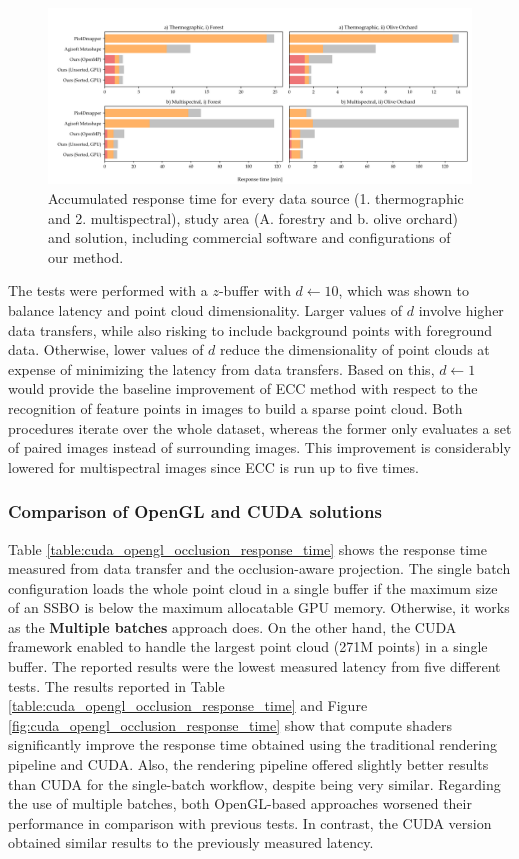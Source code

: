 \begin{figure}[ht]
    \centering
    \includegraphics[width=\linewidth]{figs/multi_thermal_projection/results/stacked_global_time.png}
    \caption{Accumulated response time for every data source (1. thermographic and 2. multispectral), study area (A. forestry and b. olive orchard) and solution, including commercial software and configurations of our method. }
    \label{fig:occlusion_results_global_time}
\end{figure}

The tests were performed with a $z$-buffer with $d \gets 10$, which was shown to balance latency and point cloud dimensionality. Larger values of $d$ involve higher data transfers, while also risking to include background points with foreground data. Otherwise, lower values of $d$ reduce the dimensionality of point clouds at expense of minimizing the latency from data transfers. Based on this, $d \gets 1$ would provide the baseline improvement of ECC method with respect to the recognition of feature points in images to build a sparse point cloud. Both procedures iterate over the whole dataset, whereas the former only evaluates a set of paired images instead of surrounding images. This improvement is considerably lowered for multispectral images since ECC is run up to five times. 

\subsubsection{Comparison of OpenGL and CUDA solutions}

Table \ref{table:cuda_opengl_occlusion_response_time} shows the response time measured from data transfer and the occlusion-aware projection. The single batch configuration loads the whole point cloud in a single buffer if the maximum size of an SSBO is below the maximum allocatable GPU memory. Otherwise, it works as the \textbf{Multiple batches} approach does. On the other hand, the CUDA framework enabled to handle the largest point cloud (271M points) in a single buffer. The reported results were the lowest measured latency from five different tests. The results reported in Table \ref{table:cuda_opengl_occlusion_response_time} and Figure \ref{fig:cuda_opengl_occlusion_response_time} show that compute shaders significantly improve the response time obtained using the traditional rendering pipeline and CUDA. Also, the rendering pipeline offered slightly better results than CUDA for the single-batch workflow, despite being very similar. Regarding the use of multiple batches, both OpenGL-based approaches worsened their performance in comparison with previous tests. In contrast, the CUDA version obtained similar results to the previously measured latency. 

